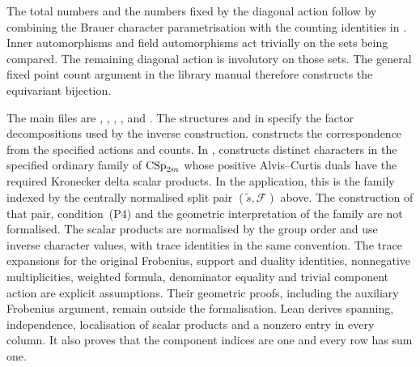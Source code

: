 The total numbers and the numbers fixed by the diagonal action follow by
combining the Brauer character parametrisation with the counting identities in
\cite[Corollary~4.3, Proposition~6.1 and proof of Theorem~6.2]
{FengMalle2022}. Inner automorphisms and field automorphisms act trivially
on the sets being compared. The remaining diagonal action is involutory on
those sets. The general fixed point count argument in the library manual
therefore constructs the equivariant bijection.

\begin{implementation}
The main files are
,
,
,
,
 and
.
The structures  and
 in  specify
the factor decompositions used by the inverse construction.
 constructs the
correspondence from the specified actions and counts.
In ,
 constructs distinct characters in the specified
ordinary family of $\operatorname{CSp}_{2m}$ whose positive Alvis--Curtis duals have
the required Kronecker delta scalar products. In the application,
this is the family indexed by the centrally normalised split pair
$(\widetilde s,\mathcal F)$ above. The construction of that pair,
condition~\textup{(P4)} and the geometric interpretation of the
family are not formalised. The scalar products are normalised by
the group order and use inverse character values, with trace
identities in the same convention.
The trace expansions for the original Frobenius, support and
duality identities, nonnegative multiplicities, weighted formula,
denominator equality and trivial component action are explicit
assumptions. Their geometric proofs, including the auxiliary
Frobenius argument, remain outside the formalisation.
Lean derives spanning, independence, localisation of scalar
products and a nonzero entry in every column. It also proves
that the component indices are one and every row has sum one.


\end{implementation}
